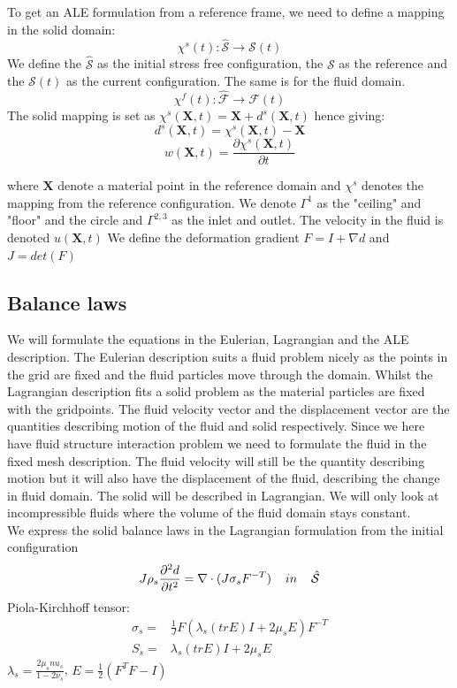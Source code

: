 To get an ALE formulation from a reference frame, we need to define a mapping in the solid domain:
$$  \chi^s(t) : \hat{\mathcal{S}} \rightarrow \mathcal{S}(t)     $$ 
We define the $ \hat{\mathcal{S}}$ as the initial stress free configuration, the $\mathcal{S}$ as the reference and the $\mathcal{S}(t)$ as the current configuration.
The same is for the fluid domain.
$$  \chi^f(t) : \hat{\mathcal{F}} \rightarrow \mathcal{F}(t)     $$ 
The solid mapping is set as $\chi^s(\textbf{X},t) = \textbf{X}  + d^s(\textbf{X} ,t)$
hence giving:
$$  d^s(\textbf{X},t) = \chi^s(\textbf{X},t) -\textbf{X}   $$
$$  w(\textbf{X},t) = \frac{\partial \chi^s(\textbf{X},t)}{\partial t}   $$

where $\textbf{X}$ denote a material point in the reference domain and $\chi^s$ denotes the mapping from the reference configuration.
We denote $\Gamma^1$ as the "ceiling" and "floor" and the circle and $\Gamma^{2,3}$ as the inlet and outlet.
The velocity in the fluid is denoted $u(\textbf{X},t)$
We define the deformation gradient $F = I + \nabla d$ and $J = det(F)$
\subsection*{Balance laws}
We will formulate the equations in the Eulerian, Lagrangian and the ALE description.
The Eulerian description suits a fluid problem nicely as the points in the grid are fixed and the fluid particles move through the domain. Whilst the Lagrangian description fits a solid problem as the material particles are fixed with the gridpoints. The fluid velocity vector and the displacement vector are the quantities describing motion of the fluid and solid respectively. Since we here have fluid structure interaction problem we need to formulate the fluid in the fixed mesh description. The fluid velocity will still be the quantity describing motion but it will also have the displacement of the fluid, describing the change in fluid domain. The solid will be described in Lagrangian. We will only look at incompressible fluids where the volume of the fluid domain stays constant.\\
We express the solid balance laws in the Lagrangian formulation from the initial configuration
$$J\rho_s \frac{\partial^2 d}{\partial t^2} = \nabla \cdot (J \sigma_s F^{-T}) \hspace{4mm}in\hspace{4mm} \mathcal{\hat{S}} $$
Piola-Kirchhoff tensor:
\begin{align*}
 \sigma_s =& \frac{1}{J} F (\lambda_s (tr E)I + 2\mu_s E) F^{-T}  \\
 S_s =& \lambda_s (tr E)I + 2\mu_s E  
\end{align*}
$\lambda_s = \frac{2\mu_s nu_s}{1-2 \nu_s} $, $ E = \frac{1}{2} (F^{T}F -I)$


